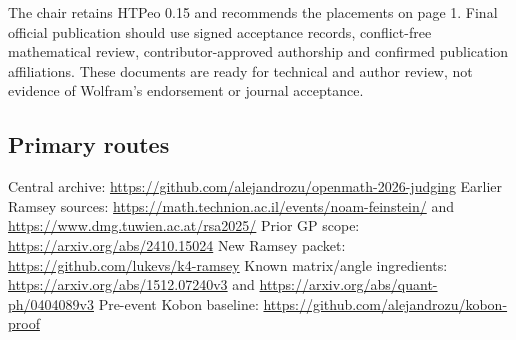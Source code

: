 \documentclass[10pt,a4paper]{article}
\begin{document}
The chair retains HTPeo 0.15 and recommends the placements on page 1. Final official publication should use signed acceptance records, conflict-free mathematical review, contributor-approved authorship and confirmed publication affiliations. These documents are ready for technical and author review, not evidence of Wolfram's endorsement or journal acceptance.

\subsection{Primary routes}
{\small Central archive: \url{https://github.com/alejandrozu/openmath-2026-judging}
Earlier Ramsey sources: \url{https://math.technion.ac.il/events/noam-feinstein/} and \url{https://www.dmg.tuwien.ac.at/rsa2025/}
Prior GP scope: \url{https://arxiv.org/abs/2410.15024}
New Ramsey packet: \url{https://github.com/lukevs/k4-ramsey}
Known matrix/angle ingredients: \url{https://arxiv.org/abs/1512.07240v3} and \url{https://arxiv.org/abs/quant-ph/0404089v3}
Pre-event Kobon baseline: \url{https://github.com/alejandrozu/kobon-proof}\par}
\end{document}
